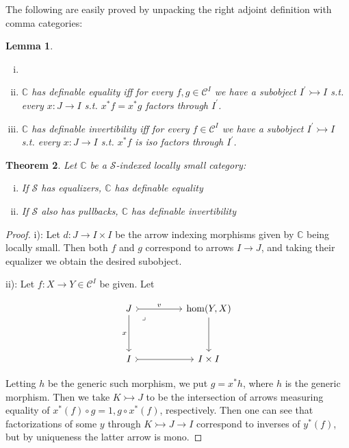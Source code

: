\documentclass[10pt, oneside]{article}
\newtheorem{theorem}{Theorem}[section]
\newtheorem{lemma}[theorem]{Lemma}
\begin{document}
The following are easily proved by unpacking the right adjoint definition with comma categories:

\begin{lemma}
    \begin{enumerate}[i)]
        \item[]

        \item $\mathbb{C}$ has definable equality iff for every $f, g \in \mathcal{C}^I$ we have a subobject $I^\prime \rightarrowtail I$ s.t. every $x: J \to I$ s.t. $x^\ast f = x^\ast g$ factors through $I^\prime$.
        
        \item $\mathbb{C}$ has definable invertibility iff for every $f \in \mathcal{C}^I$ we have a subobject $I^\prime \rightarrowtail I$ s.t. every $x: J \to I$ s.t. $x^\ast f$ is iso factors through $I^\prime$.
    \end{enumerate}
\end{lemma}

\begin{theorem}\label{thm:locally-small-def-eq-inv}
    Let $\mathbb{C}$ be a $\mathcal{S}$-indexed locally small category:
    
    \begin{enumerate}[i)]
        \item If $\mathcal{S}$ has equalizers, $\mathbb{C}$ has definable equality

        \item If $\mathcal{S}$ also has pullbacks, $\mathbb{C}$ has definable invertibility
    \end{enumerate}
\end{theorem}
\begin{proof}
    i): Let $d: J \to I \times I$ be the arrow indexing morphisms given by $\mathbb{C}$ being locally small. Then both $f$ and $g$ correspond to arrows $I \to J$, and taking their equalizer we obtain the desired subobject.

    ii): Let $f: X \to Y \in \mathcal{C}^I$ be given. Let

    \[\begin{tikzcd}[ampersand replacement=\&]
	J \&\& {\mathrm{hom}(Y, X)} \\
	\\
	I \&\& {I \times I}
	\arrow[tail, from=3-1, to=3-3]
	\arrow[from=1-3, to=3-3]
	\arrow["x"', from=1-1, to=3-1]
	\arrow["v", tail, from=1-1, to=1-3]
	\arrow["\lrcorner"{anchor=center, pos=0.125}, draw=none, from=1-1, to=3-3]
\end{tikzcd}\]

    Letting $h$ be the generic such morphism, we put $g = x^\ast h$, where $h$ is the generic morphism. Then we take $K \rightarrowtail J$ to be the intersection of arrows measuring equality of $x^\ast (f) \circ g = 1, g \circ x^\ast (f)$, respectively. Then one can see that factorizations of some $y$ through $K \rightarrowtail J \rightarrow I$ correspond to inverses of $y^\ast (f)$, but by uniqueness the latter arrow is mono.
 \end{proof}
\end{document}
